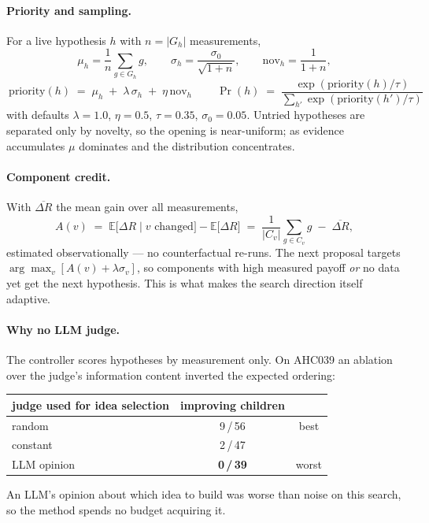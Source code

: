 \documentclass[11pt]{article}
\begin{document}
\paragraph{Priority and sampling.} For a live hypothesis $h$ with $n = |G_h|$ measurements,
\[
  \mu_h = \frac{1}{n}\sum_{g \in G_h} g, \qquad
  \sigma_h = \frac{\sigma_0}{\sqrt{1+n}}, \qquad
  \text{nov}_h = \frac{1}{1+n},
\]
\[
  \boxed{\ \text{priority}(h) \;=\; \mu_h \;+\; \lambda\,\sigma_h \;+\; \eta\,\text{nov}_h\ }
  \qquad
  \Pr(h) \;=\; \frac{\exp(\text{priority}(h)/\tau)}{\sum_{h'} \exp(\text{priority}(h')/\tau)}
\]
with defaults $\lambda = 1.0$, $\eta = 0.5$, $\tau = 0.35$, $\sigma_0 = 0.05$. Untried hypotheses
are separated only by novelty, so the opening is near-uniform; as evidence accumulates $\mu$
dominates and the distribution concentrates.

\paragraph{Component credit.} With $\overline{\Delta R}$ the mean gain over all measurements,
\[
  A(v) \;=\; \mathbb{E}\big[\Delta R \mid v \text{ changed}\big] - \mathbb{E}\big[\Delta R\big]
  \;=\; \frac{1}{|C_v|}\sum_{g \in C_v} g \;-\; \overline{\Delta R},
\]
estimated observationally --- no counterfactual re-runs. The next proposal targets
$\arg\max_v [A(v) + \lambda \sigma_v]$, so components with high measured payoff \emph{or} no data
yet get the next hypothesis. This is what makes the search direction itself adaptive.

\paragraph{Why no LLM judge.} The controller scores hypotheses by measurement only. On AHC039 an
ablation over the judge's information content inverted the expected ordering:

\begin{center}
\begin{tabular}{lcc}
\toprule
judge used for idea selection & improving children & \\
\midrule
random         & 9\,/\,56 & best \\
constant       & 2\,/\,47 & \\
LLM opinion    & \textbf{0\,/\,39} & worst \\
\bottomrule
\end{tabular}
\end{center}

\noindent An LLM's opinion about which idea to build was worse than noise on this search, so the
method spends no budget acquiring it.
\end{document}

